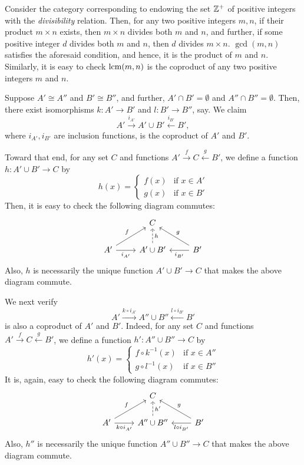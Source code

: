 \begin{xca}
Consider the category corresponding to endowing the set $\mathbb{Z}^+$ of positive
integers with the \emph{divisibility} relation. Then, for any two positive
integers $m, n$, if their product $m \times n$ exists, then $m \times n$
divides both $m$ and $n$, and further, if some positive integer $d$ divides
both $m$ and $n$, then $d$ divides $m \times n$. $\gcd(m, n)$ satisfies the
aforesaid condition, and hence, it is the product of $m$ and $n$. Similarly, it
is easy to check $\operatorname{lcm}(m, n)$ is the coproduct of any two positive integers $m$
and $n$.
\end{xca}

\begin{xca}
Suppose $A' \cong A''$ and $B' \cong B''$, and further, $A' \cap B' = \emptyset$
and $A'' \cap B'' = \emptyset$. Then, there exist isomorphisms $k: A' \to B'$
and $l: B' \to B''$, say. We claim
\[
A' \xrightarrow{i_{A'}} A' \cup B' \xleftarrow{i_{B'}} B',
\]
where $i_{A'}, i_{B'}$ are inclusion functions, is the coproduct of $A'$ and
$B'$.

Toward that end, for any set $C$ and functions $A' \xrightarrow{f} C
\xleftarrow{g} B'$, we define a function $h: A' \cup B' \to C$ by
\[
h(x) =
    \begin{cases}
        f(x) & \text{if } x \in A' \\
        g(x) & \text{if } x \in B'
    \end{cases}
\]
Then, it is easy to check the following diagram commutes:
\[
\begin{tikzcd}
    & C & \\
    A' \arrow[r, swap, "i_{A'}"]
       \arrow[ur, "f"]
       & A' \cup B' \arrow[u, swap, dashed, "h"]
                    & B' \arrow[l, "i_{B'}"]
                         \arrow[ul, swap, "g"]
\end{tikzcd}
\]
Also, $h$ is necessarily the unique function $A' \cup B' \to C$ that makes the
above diagram commute.

We next verify
\[
A' \xrightarrow{k \circ i_{A'}} A'' \cup B'' \xleftarrow{l \circ i_{B'}} B'
\]
is also a coproduct of $A'$ and $B'$. Indeed, for any set $C$ and functions
$A' \xrightarrow{f} C \xleftarrow{g} B'$, we define a function $h': A'' \cup B''
\to C$ by
\[
h'(x) =
    \begin{cases}
        f \circ k^{-1}(x) & \text{if } x \in A'' \\
        g \circ l^{-1}(x) & \text{if } x \in B''
    \end{cases}
\]
It is, again, easy to check the following diagram commutes:
\[
\begin{tikzcd}
    & C & \\
    A' \arrow[r, swap, "k \circ i_{A'}"]
       \arrow[ur, "f"]
       & A'' \cup B'' \arrow[u, swap, dashed, "h'"]
                    & B' \arrow[l, "l \circ i_{B'}"]
                         \arrow[ul, swap, "g"]
\end{tikzcd}
\]
Also, $h''$ is necessarily the unique function $A'' \cup B'' \to C$ that makes
the above diagram commute.


\end{xca}
